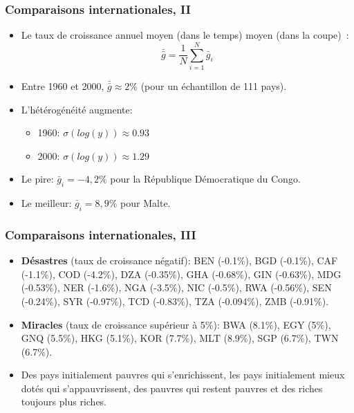 \documentclass[10pt,notheorems]{beamer}
\theoremstyle{plain}
\theoremstyle{definition} %
\begin{document}
\begin{frame}
  \frametitle{Comparaisons internationales, II}

  \bigskip

  \begin{itemize}

  \item Le taux de croissance annuel moyen (dans le temps) moyen (dans la coupe)~:
    \[
      \bar{\bar g} = \frac{1}{N}\sum_{i=1}^{N} \bar g_{i}
    \]

  \item Entre 1960 et 2000, $\bar{\bar g} \approx 2\%$ (pour un échantillon de 111 pays).\newline

  \item L'hétérogénéité augmente:
    \begin{itemize}
    \item 1960: $\sigma (log(y)) \approx 0.93$
    \item 2000: $\sigma (log(y)) \approx 1.29$
    \end{itemize}

    \bigskip

  \item Le pire: $\bar g_{i} = -4,2\%$ pour la République Démocratique du Congo.\newline

  \item Le meilleur: $\bar g_{i} = 8,9\%$ pour Malte.\newline

  \end{itemize}

\end{frame}


\begin{frame}
  \frametitle{Comparaisons internationales, III}

  \bigskip

  \begin{itemize}

  \item \textbf{Désastres} (taux de croissance négatif): BEN (-0.1\%), BGD (-0.1\%), CAF (-1.1\%), COD (-4.2\%), DZA (-0.35\%), GHA (-0.68\%), GIN (-0.63\%), MDG (-0.53\%), NER (-1.6\%), NGA (-3.5\%), NIC (-0.5\%), RWA (-0.56\%), SEN (-0.24\%), SYR (-0.97\%), TCD (-0.83\%), TZA (-0.094\%), ZMB (-0.91\%).\newline

  \item \textbf{Miracles} (taux de croissance supérieur à 5\%): BWA (8.1\%), EGY (5\%), GNQ (5.5\%), HKG (5.1\%), KOR (7.7\%), MLT (8.9\%), SGP (6.7\%), TWN (6.7\%).\newline

  \item Des pays initialement pauvres qui s'enrichissent, les pays initialement mieux dotés qui s'appauvrissent, des pauvres qui restent pauvres et des riches toujours plus riches.

  \end{itemize}

\end{frame}
\end{document}
